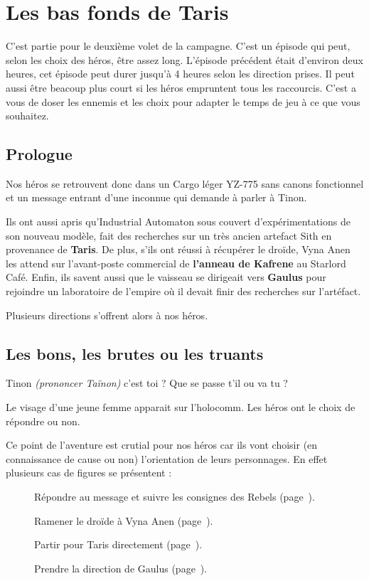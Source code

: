 \section{Les bas fonds de Taris}

C'est partie pour le deuxième volet de la campagne. C'est un épisode qui peut, selon les choix des héros, être assez long. L'épisode précédent était d'environ deux heures, cet épisode peut durer jusqu'à 4 heures selon les direction prises. Il peut aussi être beacoup plus court si les héros empruntent tous les raccourcis. C'est a vous de doser les ennemis et les choix pour adapter le temps de jeu à ce que vous souhaitez.

\subsection{Prologue}
Nos héros se retrouvent donc dans un Cargo léger YZ-775 sans canons fonctionnel et un message entrant d’une inconnue qui demande à parler à Tinon.

Ils ont aussi apris qu’Industrial Automaton sous couvert d’expérimentations de son nouveau modèle, fait des recherches sur un très ancien artefact Sith en provenance de \textbf{Taris}. De plus, s’ils ont réussi à récupérer le droïde, Vyna Anen les attend sur l’avant-poste commercial de \textbf{l’anneau de Kafrene} au Starlord Café. Enfin, ils savent aussi que le vaisseau se dirigeait vers \textbf{Gaulus} pour rejoindre un laboratoire de l’empire où il devait finir des recherches sur l’artéfact.

Plusieurs directions s’offrent alors à nos héros.

\subsection{Les bons, les brutes ou les truants}
\begin{quotebox}
    Tinon \emph{(prononcer Taïnon)} c’est toi ? Que se passe t’il ou va tu ?
\end{quotebox}
Le visage d’une jeune femme apparait sur l’holocomm. Les héros ont le choix de répondre ou non.

Ce point de l’aventure est crutial pour nos héros car ils vont choisir (en connaissance de cause ou non) l’orientation de leurs personnages. En effet plusieurs cas de figures se présentent :

\begin{description}
    \item[] Répondre au message et suivre les consignes des Rebels (page~\pageref{sec:les-rebels}).
    \item[] Ramener le droïde à Vyna Anen (page~\pageref{sec:retour-du-droide}).
    \item[] Partir pour Taris directement (page~\pageref{sec:refus-d-obtemperer}).
    \item[] Prendre la direction de Gaulus (page~\pageref{sec:l-empire}).
\end{description}

